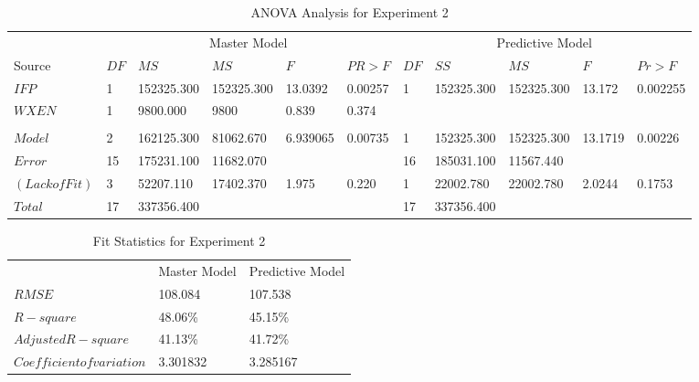 \documentclass[preprint]{sigplanconf}
\begin{document}
\begin{table}
  \centering
  \begin{tabular}{llllll|lllll}
    \multicolumn{1}{c}{} & \multicolumn{5}{c|}{Master Model}&\multicolumn{5}{c}{Predictive Model} \\
    Source&$DF$&$MS$&$MS$&$F$&$PR>F$&$DF$&$SS$&$MS$&$F$&$Pr>F$ \\
    \hline
    $IFP$&1&152325.300&152325.300 &13.0392&0.00257&1&152325.300&152325.300&13.172&0.002255 \\
    $WXEN$&1&9800.000&9800&0.839&0.374&&&&& \\
    &&&&&&&&&& \\
    $Model$&2&162125.300&81062.670&6.939065&0.00735&1&152325.300&152325.300&13.1719&0.00226\\
    $Error$&15&175231.100&11682.070&&&16&185031.100&11567.440&&\\
    $(Lack of Fit)$&3&52207.110&17402.370&1.975&0.220&1&22002.780&22002.780&2.0244&0.1753\\
    $Total$&17&337356.400& & & &17&337356.400&&& \\
  \end{tabular}
  \caption{ANOVA Analysis for Experiment 2}
  \label{tab:AnovaExperiment2}
\end{table}

\begin{table}
  \centering
  \begin{tabular}{l|ll}
    &Master Model&Predictive Model \\
    $RMSE$&108.084&107.538\\
    $R-square$&48.06\%&45.15\% \\
    $Adjusted R-square$&41.13\%&41.72\% \\
    $Coefficient of variation$&3.301832&3.285167 \\
  \end{tabular}
  \caption{Fit Statistics for Experiment 2}
  \label{tab:FitStatsExperiment2}
\end{table}
\end{document}
